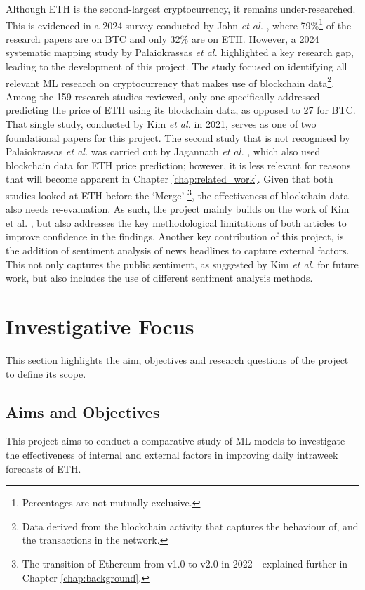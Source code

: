 \documentclass[ %
                    author={Raj Dhakan},
                supervisor={Dr. Ayush Joshi},
                    degree={MSc},
                     title={Ethereum Price Prediction using Internal and External Factors},
                  subtitle={},
                      type={},
                      year={2025}]{dissertation}
\begin{document}
Although ETH is the second-largest cryptocurrency, it remains under-researched. This is evidenced in a 2024 survey conducted by John \textit{et al.} \cite{john2024cryptocurrency}, where 79\%\footnote{Percentages are not mutually exclusive.} of the research papers are on BTC and only 32\%\footnotemark[2]{} are on ETH. However, a 2024 systematic mapping study by Palaiokrassas \textit{et al.} \cite{palaiokrassas2023machine} highlighted a key research gap, leading to the development of this project. The study focused on identifying all relevant ML research on cryptocurrency that makes use of blockchain data\footnote{Data derived from the blockchain activity that captures the behaviour of, and the transactions in the network.}. Among the 159 research studies reviewed, only one specifically addressed predicting the price of ETH using its blockchain data, as opposed to 27 for BTC. That single study, conducted by Kim \textit{et al.} \cite{RN141} in 2021, serves as one of two foundational papers for this project. The second study that is not recognised by Palaiokrassas \textit{et al.} \cite{palaiokrassas2023machine} was carried out by Jagannath \textit{et al.} \cite{jagannath2021chain}, which also used blockchain data for ETH price prediction; however, it is less relevant for reasons that will become apparent in Chapter \ref{chap:related_work}. Given that both studies looked at ETH before the `Merge' \footnote{The transition of Ethereum from v1.0 to v2.0 in 2022 - explained further in Chapter \ref{chap:background}.}, the effectiveness of blockchain data also needs re-evaluation. As such, the project mainly builds on the work of Kim et al. \cite{RN141}, but also addresses the key methodological limitations of both articles to improve confidence in the findings. Another key contribution of this project, is the addition of sentiment analysis of news headlines to capture external factors. This not only captures the public sentiment, as suggested by Kim \textit{et al.} \cite{RN141} for future work, but also includes the use of different sentiment analysis methods.

\section{Investigative Focus}
This section highlights the aim, objectives and research questions of the project to define its scope.
\subsection{Aims and Objectives}
This project aims to conduct a comparative study of ML models to investigate the effectiveness of internal and external factors in improving daily intraweek forecasts of ETH.
\end{document}
